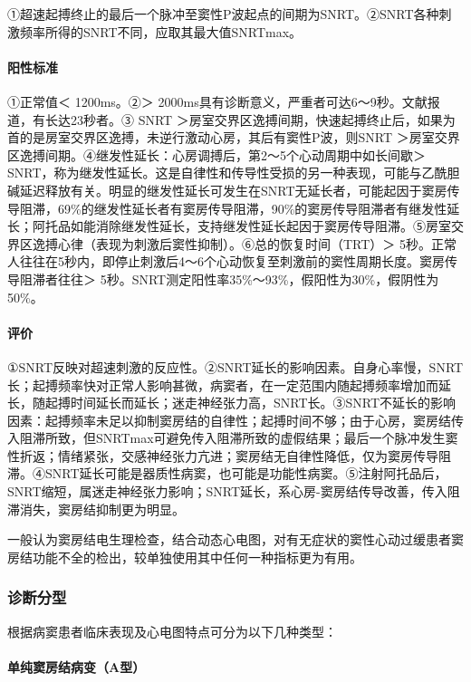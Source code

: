 ①超速起搏终止的最后一个脉冲至窦性P波起点的间期为SNRT。②SNRT各种刺激频率所得的SNRT不同，应取其最大值SNRTmax。

\paragraph{阳性标准}

①正常值＜ 1200ms。②＞
2000ms具有诊断意义，严重者可达6～9秒。文献报道，有长达23秒者。③ SNRT
＞房室交界区逸搏间期，快速起搏终止后，如果为首的是房室交界区逸搏，未逆行激动心房，其后有窦性P波，则SNRT
＞房室交界区逸搏间期。④继发性延长：心房调搏后，第2～5个心动周期中如长间歇＞
SNRT，称为继发性延长。这是自律性和传导性受损的另一种表现，可能与乙酰胆碱延迟释放有关。明显的继发性延长可发生在SNRT无延长者，可能起因于窦房传导阻滞，69\%的继发性延长者有窦房传导阻滞，90\%的窦房传导阻滞者有继发性延长；阿托品如能消除继发性延长，支持继发性延长起因于窦房传导阻滞。⑤房室交界区逸搏心律（表现为刺激后窦性抑制）。⑥总的恢复时间（TRT）＞
5秒。正常人往往在5秒内，即停止刺激后4～6个心动恢复至刺激前的窦性周期长度。窦房传导阻滞者往往＞
5秒。SNRT测定阳性率35\%～93\%，假阳性为30\%，假阴性为50\%。

\paragraph{评价}

①SNRT反映对超速刺激的反应性。②SNRT延长的影响因素。自身心率慢，SNRT长；起搏频率快对正常人影响甚微，病窦者，在一定范围内随起搏频率增加而延长，随起搏时间延长而延长；迷走神经张力高，SNRT长。③SNRT不延长的影响因素：起搏频率未足以抑制窦房结的自律性；起搏时间不够；由于心房，窦房结传入阻滞所致，但SNRTmax可避免传入阻滞所致的虚假结果；最后一个脉冲发生窦性折返；情绪紧张，交感神经张力亢进；窦房结无自律性降低，仅为窦房传导阻滞。④SNRT延长可能是器质性病窦，也可能是功能性病窦。⑤注射阿托品后，SNRT缩短，属迷走神经张力影响；SNRT延长，系心房-窦房结传导改善，传入阻滞消失，窦房结抑制更为明显。

一般认为窦房结电生理检查，结合动态心电图，对有无症状的窦性心动过缓患者窦房结功能不全的检出，较单独使用其中任何一种指标更为有用。

\subsubsection{诊断分型}

根据病窦患者临床表现及心电图特点可分为以下几种类型：

\paragraph{单纯窦房结病变（A型）}

